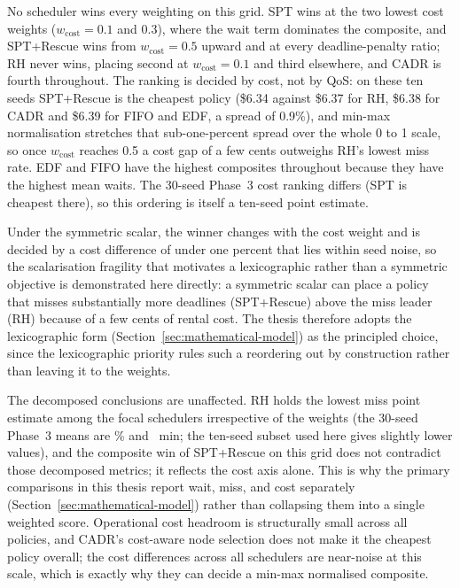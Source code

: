 {\begin{table}[htbp]
\centering
\caption[Objective-weight sensitivity]{Objective-weight sensitivity: normalised composite objective per scheduler (lower is better) on the hectic day ($n=10$ seeds, $C_{\max}=5$). Components are min-max normalised across schedulers before weighting. The minimum (winning) scheduler in each row is \textbf{bold}; the symmetric reference configuration ($w_{\text{qos}}=w_{\text{cost}}=0.5$, $\alpha_2/\alpha_1=10$) appears as the marked row in both panels.}
\label{tab:weight_sensitivity}

\end{table}

No scheduler wins every weighting on this grid. SPT wins at the two lowest cost weights ($w_{\text{cost}}=0.1$ and $0.3$), where the wait term dominates the composite, and SPT+Rescue wins from $w_{\text{cost}}=0.5$ upward and at every deadline-penalty ratio; RH never wins, placing second at $w_{\text{cost}}=0.1$ and third elsewhere, and CADR is fourth throughout. The ranking is decided by cost, not by QoS: on these ten seeds SPT+Rescue is the cheapest policy (\$6.34 against \$6.37 for RH, \$6.38 for CADR and \$6.39 for FIFO and EDF, a spread of 0.9\%), and min-max normalisation stretches that sub-one-percent spread over the whole 0 to 1 scale, so once $w_{\text{cost}}$ reaches 0.5 a cost gap of a few cents outweighs RH's lowest miss rate. EDF and FIFO have the highest composites throughout because they have the highest mean waits. The 30-seed Phase~3 cost ranking differs (SPT is cheapest there), so this ordering is itself a ten-seed point estimate.

Under the symmetric scalar, the winner changes with the cost weight and is decided by a cost difference of under one percent that lies within seed noise, so the scalarisation fragility that motivates a lexicographic rather than a symmetric objective is demonstrated here directly: a symmetric scalar can place a policy that misses substantially more deadlines (SPT+Rescue) above the miss leader (RH) because of a few cents of rental cost. The thesis therefore adopts the lexicographic form (Section~\ref{sec:mathematical-model}) as the principled choice, since the lexicographic priority rules such a reordering out by construction rather than leaving it to the weights.

The decomposed conclusions are unaffected. RH holds the lowest miss point estimate among the focal schedulers irrespective of the weights (the 30-seed Phase~3 means are \RHMiss\% and \RHWait~min; the ten-seed subset used here gives slightly lower values), and the composite win of SPT+Rescue on this grid does not contradict those decomposed metrics; it reflects the cost axis alone. This is why the primary comparisons in this thesis report wait, miss, and cost separately (Section~\ref{sec:mathematical-model}) rather than collapsing them into a single weighted score. Operational cost headroom is structurally small across all policies, and CADR's cost-aware node selection does not make it the cheapest policy overall; the cost differences across all schedulers are near-noise at this scale, which is exactly why they can decide a min-max normalised composite.

}
